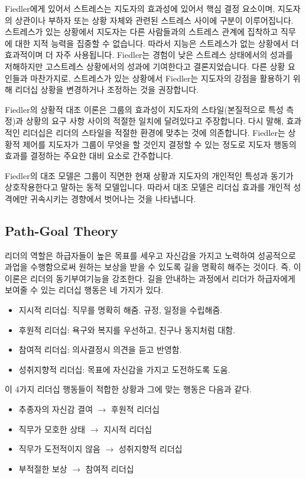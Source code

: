 Fiedler에게 있어서 스트레스는 지도자의 효과성에 있어서 핵심 결정 요소이며,
지도자의 상관이나 부하자 또는 상황 자체와 관련된 스트레스 사이에 구분이
이루어집니다. 스트레스가 있는 상황에서 지도자는 다른 사람들과의 스트레스 관계에
집착하고 직무에 대한 지적 능력을 집중할 수 없습니다. 따라서 지능은 스트레스가
없는 상황에서 더 효과적이며 더 자주 사용됩니다. Fiedler는 경험이 낮은 스트레스
상태에서의 성과를 저해하지만 고스트레스 상황에서의 성과에 기여한다고
결론지었습니다. 다른 상황 요인들과 마찬가지로, 스트레스가 있는 상황에서
Fiedler는 지도자의 강점을 활용하기 위해 리더십 상황을 변경하거나 조정하는 것을
권장합니다.

Fiedler의 상황적 대조 이론은 그룹의 효과성이 지도자의 스타일(본질적으로 특성
측정)과 상황의 요구 사항 사이의 적절한 일치에 달려있다고 주장합니다. 다시 말해,
효과적인 리더십은 리더의 스타일을 적절한 환경에 맞추는 것에 의존합니다.
Fiedler는 상황적 제어를 지도자가 그룹이 무엇을 할 것인지 결정할 수 있는 정도로
지도자 행동의 효과를 결정하는 주요한 대비 요소로 간주합니다.

Fiedler의 대조 모델은 그룹이 직면한 현재 상황과 지도자의 개인적인 특성과 동기가
상호작용한다고 말하는 동적 모델입니다. 따라서 대조 모델은 리더십 효과를 개인적
성격에만 귀속시키는 경향에서 벗어나는 것을 나타냅니다.

\begin{quote}
\end{quote}

\subsection*{Path-Goal Theory}
리더의 역할은 하급자들이 높은 목표를 세우고 자신감을 가지고 노력하여 성공적으로
과업을 수행함으로써 원하는 보상을 받을 수 있도록 길을 명확히 해주는 것이다. 즉,
이 이론은 리더의 동기부여기능을 강조한다. 길을 안내하는 과정에서 리더가
하급자에게 보여줄 수 있는 리더십 행동은 네 가지가 있다.
\begin{itemize}
  \item 지시적 리더십: 직무를 명확히 해줌. 규정, 일정을 수립해줌.
  \item 후원적 리더십: 욕구와 복지를 우선하고, 친구나 동지처럼 대함.
  \item 참여적 리더십: 의사결정시 의견을 듣고 반영함.
  \item 성취지향적 리더십: 목표에 자신감을 가지고 도전하도록 도움.
\end{itemize}
이 4가지 리더십 행동들이 적합한 상황과 그에 맞는 행동은 다음과 같다.
\begin{itemize}
  \item 추종자의 자신감 결여 $\to$ 후원적 리더십
  \item 직무가 모호한 상태 $\to$ 지시적 리더십
  \item 직무가 도전적이지 않음 $\to$ 성취지향적 리더십
  \item 부적절한 보상 $\to$ 참여적 리더십
\end{itemize}

